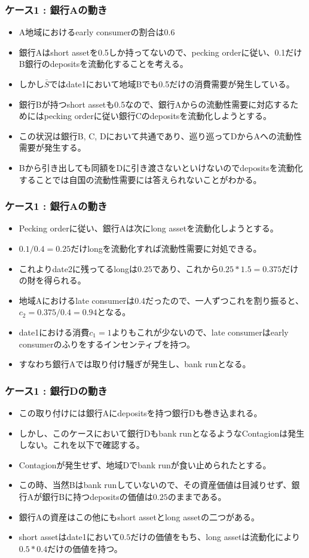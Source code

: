 \documentclass[dvipdfmx, 12pt]{beamer}
\begin{document}
\begin{frame}\frametitle{ケース1 : 銀行Aの動き}
	\begin{itemize}
	\item A地域におけるearly consumerの割合は0.6
	\item 銀行Aはshort assetを0.5しか持ってないので、pecking orderに従い、0.1だけB銀行のdepositsを流動化することを考える。
	\item しかし$\bar{S}$ではdate1において地域Bでも0.5だけの消費需要が発生している。
	\item 銀行Bが持つshort assetも0.5なので、銀行Aからの流動性需要に対応するためにはpecking orderに従い銀行Cのdepositsを流動化しようとする。
	\item この状況は銀行B, C, Dにおいて共通であり、巡り巡ってDからAへの流動性需要が発生する。
	\item Bから引き出しても同額をDに引き渡さないといけないのでdepositsを流動化することでは自国の流動性需要には答えられないことがわかる。
	\end{itemize}
\end{frame}

\begin{frame}\frametitle{ケース1 : 銀行Aの動き}
	\begin{itemize}
	\item Pecking orderに従い、銀行Aは次にlong assetを流動化しようとする。
	\item $0.1/0.4 = 0.25$だけlongを流動化すれば流動性需要に対処できる。
	\item これよりdate2に残ってるlongは$0.25$であり、これから$0.25 * 1.5 = 0.375$だけの財を得られる。
	\item 地域Aにおけるlate consumerは0.4だったので、一人ずつこれを割り振ると、$c_2 = 0.375 / 0.4 = 0.94$となる。
	\item date1における消費$c_1 = 1$よりもこれが少ないので、late consumerはearly consumerのふりをするインセンティブを持つ。
	\item すなわち銀行Aでは取り付け騒ぎが発生し、bank runとなる。
	\end{itemize}
\end{frame}

\begin{frame}\frametitle{ケース1 : 銀行Dの動き}
	\begin{itemize}
	\item この取り付けには銀行Aにdepositsを持つ銀行Dも巻き込まれる。
	\item しかし、このケースにおいて銀行Dもbank runとなるようなContagionは発生しない。これを以下で確認する。
	\item Contagionが発生せず、地域Dでbank runが食い止められたとする。
	\item この時、当然Bはbank runしていないので、その資産価値は目減りせず、銀行Aが銀行Bに持つdepositsの価値は$0.25$のままである。
	\item 銀行Aの資産はこの他にもshort assetとlong assetの二つがある。
	\item short assetはdate1において$0.5$だけの価値をもち、long assetは流動化により$0.5 * 0.4$だけの価値を持つ。
	\end{itemize}
\end{frame}
\end{document}
